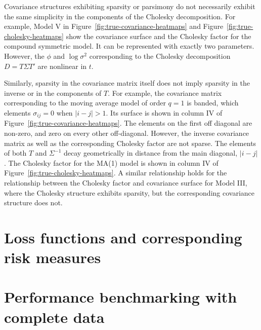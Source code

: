 \documentclass[12pt]{article}
\theoremstyle{definition}
\begin{document}


Covariance structures exhibiting sparsity or parsimony do not necessarily exhibit the same simplicity in the components of the Cholesky decomposition.  For example, Model V in Figure~\ref{fig:true-covariance-heatmaps} and Figure~\ref{fig:true-cholesky-heatmaps} show the covariance surface and the Cholesky factor for the compound symmetric model. It can be represented with exactly two parameters. However, the $\phi$ and $\log \sigma^2$ corresponding to the Cholesky decomposition $D = T \Sigma T'$ are nonlinear in $t$. 

\bigskip

Similarly, sparsity in the covariance matrix itself does not imply sparsity in the inverse or in the components of $T$. For example, the covariance matrix corresponding to the moving average model of order $q=1$  is banded, which elements $\sigma_{ij} = 0$ when $\vert i-j \vert > 1$.  Its surface is shown in column IV of Figure~\ref{fig:true-covariance-heatmaps}. The elements on the first off diagonal are non-zero, and zero on every other off-diagonal. However, the inverse covariance matrix as well as the corresponding Cholesky factor are not sparse. The elements of both $T$ and $\Sigma^{-1}$ decay geometrically in distance from the main diagonal,  $\vert i-j \vert$.  The Cholesky factor for the MA(1) model is shown in column IV of  Figure~\ref{fig:true-cholesky-heatmaps}. A similar relationship holds for the relationship between the Cholesky factor and covariance surface for Model III, where the Cholesky structure exhibits sparsity, but the corresponding covariance structure does not. 

\bigskip


\bigskip

\section{Loss functions and corresponding risk measures}



%

\bigskip



\section{Performance benchmarking with complete data}
\end{document}
